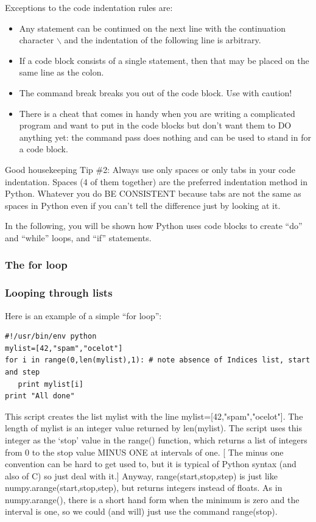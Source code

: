 \documentclass[11pt]{book}
\begin{document}
{{{{\noindent Exceptions to the code indentation rules are:
\begin{itemize}
\item  Any statement can be continued on the next line with the continuation character $\backslash$ and the indentation of the following line is arbitrary.  \item If a code block consists of a single statement, then that may be placed on the same line as the colon.
\item The command {\color{blue}break} breaks you out of the code block. Use with caution!
\item There is a cheat that comes in handy when you are writing a complicated program and want to put in the code blocks but don't want them to DO anything yet:  the command  {\color{blue} pass} does nothing and can be used to stand in for a code block.
\end{itemize}

{ \color{magenta}Good housekeeping Tip \#2: Always use only spaces or only tabs in your code indentation. Spaces (4 of them together) are the preferred indentation method in Python.  Whatever you do BE CONSISTENT because tabs are not the same as spaces in Python even if you can't tell the difference just by looking at it.}


In the following, you will be shown how Python uses code blocks  to create ``do'' and ``while'' loops, and ``if'' statements.

\subsubsection{The for loop}
\subsubsection{Looping through lists}

Here is an example of a simple  ``for loop'':


{ \color{blue} \begin{verbatim}
#!/usr/bin/env python
mylist=[42,"spam","ocelot"]
for i in range(0,len(mylist),1): # note absence of Indices list, start and step
   print mylist[i]
print "All done"
\end{verbatim}}

This script creates the list mylist with the line {\color{blue}mylist=[42,"spam","ocelot"]}.  The length of mylist is an integer value returned by {\color{blue}len(mylist)}.      The script uses this integer as the `stop' value in the  {\color{blue}range()} function,  which returns a list of integers from 0 to the stop value  MINUS ONE at intervals of one.   [ The minus one convention can be hard to get used to, but it is typical of Python syntax (and also of C) so just deal with it.]  Anyway, {\color{blue}range(start,stop,step)} is just like {\color{blue}numpy.arange(start,stop,step)}, but returns integers instead of floats.  As in {\color{blue}numpy.arange()}, there is a short hand form when the minimum is zero and the interval is one, so we could (and will) just use the command {\color{blue}range(stop)}.

}}}}
\end{document}
